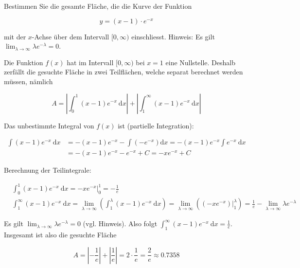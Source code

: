 \begin{example}
    Bestimmen Sie die gesamte Fläche, die die Kurve der Funktion

$$
y=(x-1) \cdot e^{-x}
$$

mit der $x$-Achse über dem Intervall $[0, \infty)$ einschliesst. Hinweis: Es gilt $\lim _{\lambda \rightarrow \infty} \lambda e^{-\lambda}=0$.

\tcblower

Die Funktion $f(x)$ hat im Intervall $[0, \infty)$ bei $x=1$ eine Nullstelle. Deshalb zerfällt die gesuchte Fläche in zwei Teilflächen, welche separat berechnet werden müssen, nämlich

$$
A=\left|\int_{0}^{1}(x-1) e^{-x} \mathrm{~d} x\right|+\left|\int_{1}^{\infty}(x-1) e^{-x} \mathrm{~d} x\right|
$$

Das unbestimmte Integral von $f(x)$ ist (partielle Integration):

$$
\begin{aligned}
\int(x-1) e^{-x} \mathrm{~d} x & =-(x-1) e^{-x}-\int\left(-e^{-x}\right) \mathrm{d} x=-(x-1) e^{-x} \int e^{-x} \mathrm{~d} x \\
& =-(x-1) e^{-x}-e^{-x}+C=-x e^{-x}+C
\end{aligned}
$$

Berechnung der Teilintegrale:

$$
\begin{aligned}
& \int_{0}^{1}(x-1) e^{-x} \mathrm{~d} x=-\left.x e^{-x}\right|_{0} ^{1}=-\frac{1}{e} \\
& \int_{1}^{\infty}(x-1) e^{-x} \mathrm{~d} x=\lim _{\lambda \rightarrow \infty}\left(\int_{1}^{\lambda}(x-1) e^{-x} \mathrm{~d} x\right)=\lim _{\lambda \rightarrow \infty}\left(\left.\left(-x e^{-x}\right)\right|_{1} ^{\lambda}\right)=\frac{1}{e}-\lim _{\lambda \rightarrow \infty} \lambda e^{-\lambda}
\end{aligned}
$$

Es gilt $\lim _{\lambda \rightarrow \infty} \lambda e^{-\lambda}=0$ (vgl. Hinweis). Also folgt $\int_{1}^{\infty}(x-1) e^{-x} \mathrm{~d} x=\frac{1}{e}$. Insgesamt ist also die gesuchte Fläche

$$
A=\left|-\frac{1}{e}\right|+\left|\frac{1}{e}\right|=2 \cdot \frac{1}{e}=\frac{2}{e} \approx 0.7358
$$
    
\end{example}
